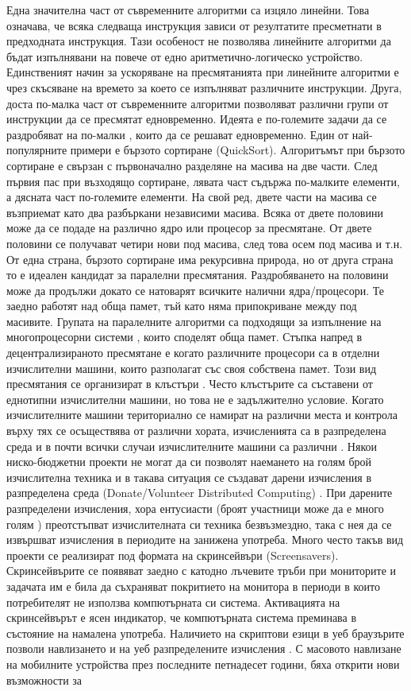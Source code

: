 Една значителна част от съвременните алгоритми са изцяло линейни. Това означава, че всяка следваща инструкция зависи от резултатите пресметнати в предходната инструкция. Тази особеност не позволява линейните алгоритми да бъдат изпълнявани на повече от едно аритметично-логическо устройство. Единственият начин за ускоряване на пресмятанията при линейните алгоритми е чрез скъсяване на времето за което се изпълняват различните инструкции. Друга, доста по-малка част от съвременните алгоритми позволяват различни групи от инструкции да се пресмятат едновременно. Идеята е по-големите задачи да се раздробяват на по-малки \cite{Mendivil-01}, които да се решават едновременно. Един от най-популярните примери е бързото сортиране (QuickSort). Алгоритъмът при бързото сортиране е свързан с първоначално разделяне на масива на две части. След първия пас при възходящо сортиране, лявата част съдържа по-малките елементи, а дясната част по-големите елементи. На свой ред, двете части на масива се възприемат като два разбъркани независими масива. Всяка от двете половини може да се подаде на различно ядро или процесор за пресмятане. От двете половини се получават четири нови под масива, след това осем под масива и т.н. От една страна, бързото сортиране има рекурсивна природа, но от друга страна то е идеален кандидат за паралелни пресмятания. Раздробяването на половини може да продължи докато се натоварят всичките налични ядра/процесори. Те заедно работят над обща памет, тъй като няма припокриване между под масивите. Групата на паралелните алгоритми са подходящи за изпълнение на многопроцесорни системи \cite{Topping-01}, които споделят обща памет. Стъпка напред в децентрализираното пресмятане е когато различните процесори са в отделни изчислителни машини, които разполагат със своя собствена памет. Този вид пресмятания се организират в клъстъри \cite{Desell-02}. Често клъстърите са съставени от еднотипни изчислителни машини, но това не е задължително условие. Когато изчислителните машини териториално се намират на различни места и контрола върху тях се осъществява от различни хората, изчисленията са в разпределена среда и в почти всички случаи изчислителните машини са различни \cite{Kattan-02}. Някои ниско-бюджетни проекти не могат да си позволят наемането на голям брой изчислителна техника \cite{Merelo-Guervos-01} и в такава ситуация се създават дарени изчисления в разпределена среда (Donate/Volunteer Distributed Computing) \cite{Varacha-01}. При дарените разпределени изчисления, хора ентусиасти (броят участници може да е много голям \cite{Castillo-01}) преотстъпват изчислителната си техника безвъзмездно, така с нея да се извършват изчисления в периодите на занижена употреба. Много често такъв вид проекти се реализират под формата на скринсейвъри (Screensavers). Скринсейвърите се появяват заедно с катодно лъчевите тръби при мониторите и задачата им е била да съхраняват покритието на монитора в периоди в които потребителят не използва компютърната си система. Активацията на скринсейвърът е ясен индикатор, че компютърната система преминава в състояние на намалена употреба. Наличието на скриптови езици в уеб браузърите позволи навлизането и на уеб разпределените изчисления \cite{Duda-01}. С масовото навлизане на мобилните устройства през последните петнадесет години, бяха открити нови възможности за 
